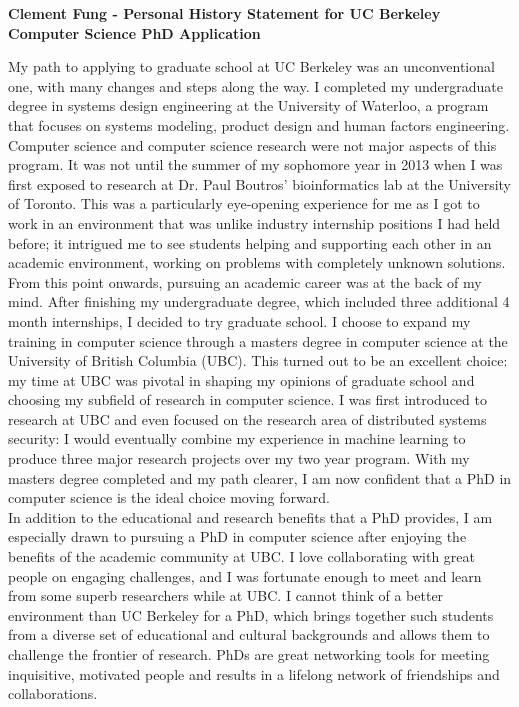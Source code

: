 \documentclass[10pt]{article} %
\begin{document}
\begin{center}
{\Large \bf Clement Fung - Personal History Statement for UC Berkeley Computer Science PhD Application}
\end{center}


My path to applying to graduate school at UC Berkeley was an unconventional one, with many changes and steps along the way. I completed my undergraduate degree in systems design engineering at the University of Waterloo, a program that focuses on systems modeling, product design and human factors engineering. Computer science and computer science research were not major aspects of this program. It was not until the summer of my sophomore year in 2013 when I was first exposed to research at Dr. Paul Boutros' bioinformatics lab at the University of Toronto. This was a particularly eye-opening experience for me as I got to work in an environment that was unlike industry internship positions I had held before; it intrigued me to see students helping and supporting each other in an academic environment, working on problems with completely unknown solutions. \\

From this point onwards, pursuing an academic career was at the back of my mind. After finishing my undergraduate degree, which included three additional 4 month internships, I decided to try graduate school. I choose to expand my training in computer science through a masters degree in computer science at the University of British Columbia (UBC). This turned out to be an excellent choice: my time at UBC was pivotal in shaping my opinions of graduate school and choosing my subfield of research in computer science. I was first introduced to research at UBC and even focused on the research area of distributed systems security: I would eventually combine my experience in machine learning to produce three major research projects over my two year program. With my masters degree completed and my path clearer, I am now confident that a PhD in computer science is the ideal choice moving forward. \\

In addition to the educational and research benefits that a PhD provides, I am especially drawn to pursuing a PhD in computer science after enjoying the benefits of the academic community at UBC. I love collaborating with great people on engaging challenges, and I was fortunate enough to meet and learn from some superb researchers while at UBC. I cannot think of a better environment than UC Berkeley for a PhD, which brings together such students from a diverse set of educational and cultural backgrounds and allows them to challenge the frontier of research. PhDs are great networking tools for meeting inquisitive, motivated people and results in a lifelong network of friendships and collaborations. \\
\end{document}
